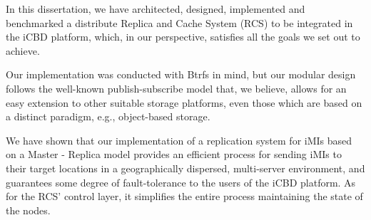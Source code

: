 


In this dissertation, we have architected, designed, implemented and benchmarked a distribute Replica and Cache System (RCS) to be integrated in the iCBD platform, which, in our perspective, satisfies all the goals we set out to achieve.

Our implementation was conducted with Btrfs in mind, but our modular design follows the well-known publish-subscribe model that, we believe, allows for an easy extension to other suitable storage platforms, even those which are based on a distinct paradigm, e.g., object-based storage.

We have shown that our implementation of a replication system for iMIs based on a Master - Replica model provides an efficient process for sending iMIs to their target locations in a geographically dispersed, multi-server environment, and guarantees some degree of fault-tolerance to the users of the iCBD platform. As for the RCS’ control layer, it simplifies the entire process maintaining the state of the nodes.

